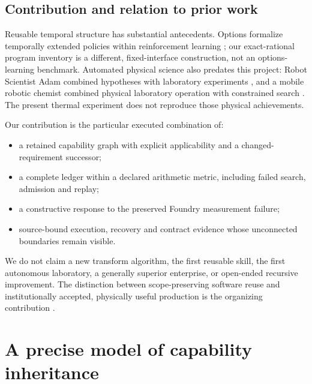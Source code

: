 \documentclass[11pt,a4paper]{article}
\begin{document}
\subsection{Contribution and relation to prior work}
Reusable temporal structure has substantial antecedents. Options formalize temporally extended policies within reinforcement learning \cite{sutton1999options}; our exact-rational program inventory is a different, fixed-interface construction, not an options-learning benchmark. Automated physical science also predates this project: Robot Scientist Adam combined hypotheses with laboratory experiments \cite{king2009automation}, and a mobile robotic chemist combined physical laboratory operation with constrained search \cite{burger2020robotic}. The present thermal experiment does not reproduce those physical achievements.

Our contribution is the particular executed combination of:
\begin{itemize}
\item a retained capability graph with explicit applicability and a changed-requirement successor;
\item a complete ledger within a declared arithmetic metric, including failed search, admission and replay;
\item a constructive response to the preserved Foundry measurement failure;
\item source-bound execution, recovery and contract evidence whose unconnected boundaries remain visible.
\end{itemize}
We do not claim a new transform algorithm, the first reusable skill, the first autonomous laboratory, a generally superior enterprise, or open-ended recursive improvement. The distinction between scope-preserving software reuse and institutionally accepted, physically useful production is the organizing contribution \cite{alphasource,compoundingdata,thermalguide}.

\section{A precise model of capability inheritance}\label{sec:model}
\end{document}

